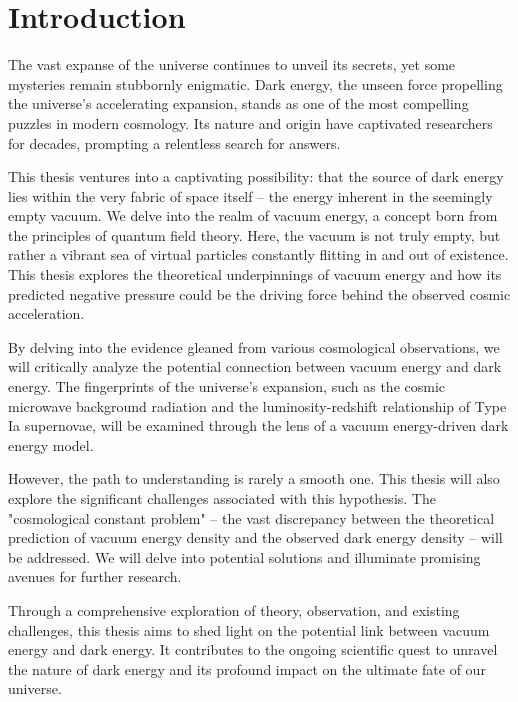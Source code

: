 \section{Introduction}
The vast expanse of the universe continues to unveil its secrets, yet some mysteries remain stubbornly enigmatic. Dark energy, the unseen force propelling the universe's accelerating expansion, stands as one of the most compelling puzzles in modern cosmology. Its nature and origin have captivated researchers for decades, prompting a relentless search for answers.

This thesis ventures into a captivating possibility: that the source of dark energy lies within the very fabric of space itself – the energy inherent in the seemingly empty vacuum.  We delve into the realm of vacuum energy, a concept born from the principles of quantum field theory. Here, the vacuum is not truly empty, but rather a vibrant sea of virtual particles constantly flitting in and out of existence.  This thesis explores the theoretical underpinnings of vacuum energy and how its predicted negative pressure could be the driving force behind the observed cosmic acceleration.

By delving into the evidence gleaned from various cosmological observations, we will critically analyze the potential connection between vacuum energy and dark energy. The fingerprints of the universe's expansion, such as the cosmic microwave background radiation and the luminosity-redshift relationship of Type Ia supernovae, will be examined through the lens of a vacuum energy-driven dark energy model.

However, the path to understanding is rarely a smooth one. This thesis will also explore the significant challenges associated with this hypothesis. The "cosmological constant problem" – the vast discrepancy between the theoretical prediction of vacuum energy density and the observed dark energy density – will be addressed. We will delve into potential solutions and illuminate promising avenues for further research.

Through a comprehensive exploration of theory, observation, and existing challenges, this thesis aims to shed light on the potential link between vacuum energy and dark energy. It contributes to the ongoing scientific quest to unravel the nature of dark energy and its profound impact on the ultimate fate of our universe.